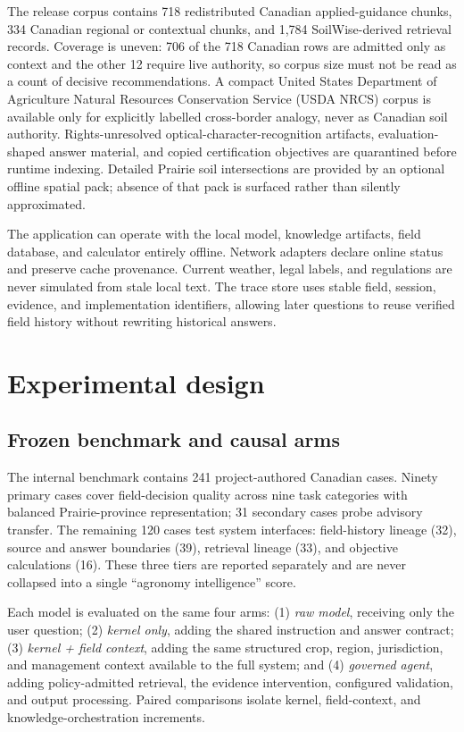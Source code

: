 \documentclass[9pt,twocolumn]{article}
\begin{document}
The release corpus contains 718 redistributed Canadian applied-guidance chunks, 334 Canadian regional or contextual chunks, and 1,784 SoilWise-derived retrieval records. Coverage is uneven: 706 of the 718 Canadian rows are admitted only as context and the other 12 require live authority, so corpus size must not be read as a count of decisive recommendations. A compact United States Department of Agriculture Natural Resources Conservation Service (USDA NRCS) corpus is available only for explicitly labelled cross-border analogy, never as Canadian soil authority. Rights-unresolved optical-character-recognition artifacts, evaluation-shaped answer material, and copied certification objectives are quarantined before runtime indexing. Detailed Prairie soil intersections are provided by an optional offline spatial pack; absence of that pack is surfaced rather than silently approximated.

The application can operate with the local model, knowledge artifacts, field database, and calculator entirely offline. Network adapters declare online status and preserve cache provenance. Current weather, legal labels, and regulations are never simulated from stale local text. The trace store uses stable field, session, evidence, and implementation identifiers, allowing later questions to reuse verified field history without rewriting historical answers.

\section{Experimental design}

\subsection{Frozen benchmark and causal arms}

The internal benchmark contains 241 project-authored Canadian cases. Ninety primary cases cover field-decision quality across nine task categories with balanced Prairie-province representation; 31 secondary cases probe advisory transfer. The remaining 120 cases test system interfaces: field-history lineage (32), source and answer boundaries (39), retrieval lineage (33), and objective calculations (16). These three tiers are reported separately and are never collapsed into a single ``agronomy intelligence'' score.

Each model is evaluated on the same four arms: (1) \textit{raw model}, receiving only the user question; (2) \textit{kernel only}, adding the shared instruction and answer contract; (3) \textit{kernel + field context}, adding the same structured crop, region, jurisdiction, and management context available to the full system; and (4) \textit{governed agent}, adding policy-admitted retrieval, the evidence intervention, configured validation, and output processing. Paired comparisons isolate kernel, field-context, and knowledge-orchestration increments.
\end{document}
